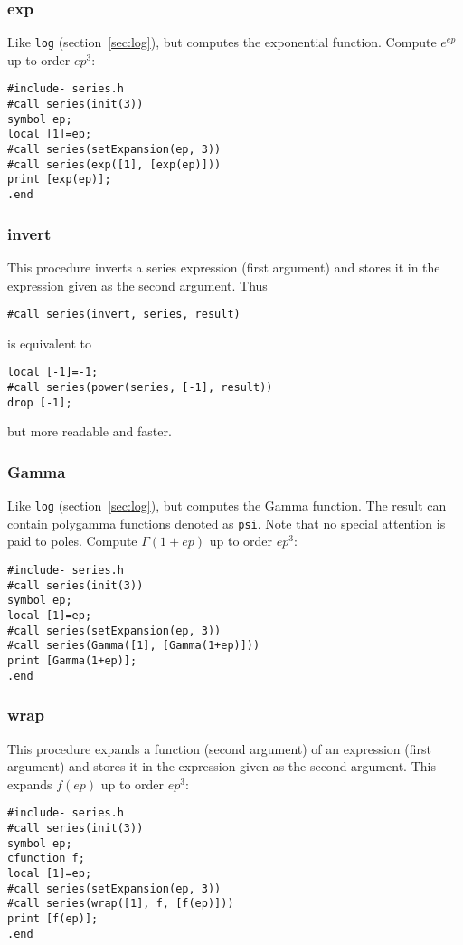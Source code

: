 \documentclass[titlepage]{article}
\begin{document}
\subsubsection{exp}
\label{sec:exp}

Like {\tt log} (section~\ref{sec:log}), but computes the
exponential function. Compute $e^{ep}$ up to order $ep^3$:
\begin{lstlisting}
#include- series.h
#call series(init(3))
symbol ep;
local [1]=ep;
#call series(setExpansion(ep, 3))
#call series(exp([1], [exp(ep)]))
print [exp(ep)];
.end
\end{lstlisting}


\subsubsection{invert}
\label{sec:invert}

This procedure inverts a series expression (first argument) and stores
it in the expression given as the second argument. Thus
\begin{lstlisting}
#call series(invert, series, result)
\end{lstlisting}
is equivalent to
\begin{lstlisting}
local [-1]=-1;
#call series(power(series, [-1], result))
drop [-1];
\end{lstlisting}
but more readable and faster.

\subsubsection{Gamma}
\label{sec:gamma}

Like {\tt log} (section~\ref{sec:log}), but computes the
Gamma function. The result can contain polygamma functions denoted as
{\tt psi}. Note that no special attention is paid to poles.
Compute $\Gamma(1+ep)$ up to order $ep^3$:
\begin{lstlisting}
#include- series.h
#call series(init(3))
symbol ep;
local [1]=ep;
#call series(setExpansion(ep, 3))
#call series(Gamma([1], [Gamma(1+ep)]))
print [Gamma(1+ep)];
.end
\end{lstlisting}


\subsubsection{wrap}
\label{sec:wrap}

This procedure expands a function (second argument) of an expression
(first argument)
and stores it in the expression given as the second argument.
This expands $f(ep)$ up to order $ep^3$:
\begin{lstlisting}
#include- series.h
#call series(init(3))
symbol ep;
cfunction f;
local [1]=ep;
#call series(setExpansion(ep, 3))
#call series(wrap([1], f, [f(ep)]))
print [f(ep)];
.end
\end{lstlisting}
\end{document}
